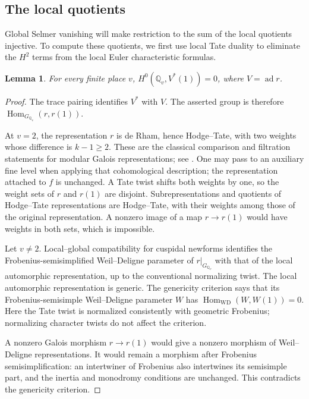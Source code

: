\documentclass[11pt]{article}
\newtheorem{lemma}[theorem]{Lemma}
\theoremstyle{remark}
\numberwithin{equation}{section}
\newcommand{\Q}{\mathbb Q}
\DeclareMathOperator{\Hom}{Hom}
\DeclareMathOperator{\ad}{ad}
\begin{document}
\subsection{The local quotients}
Global Selmer vanishing will make restriction to the sum of the
local quotients injective. To compute these quotients, we first use
local Tate duality to eliminate the $H^2$ terms from the local
Euler characteristic formulas.

\begin{lemma}\label{lem:local-invariants}
For every finite place $v$,
$H^0(\Q_v,V^*(1))=0$, where $V=\ad r$.
\end{lemma}
\begin{proof}
The trace pairing identifies $V^*$ with $V$. The asserted group
is therefore $\Hom_{G_{\Q_v}}(r,r(1))$.

At $v=2$, the representation $r$ is de Rham, hence Hodge--Tate,
with two weights whose difference is $k-1\geq2$. These are the
classical comparison and filtration statements for modular Galois
representations; see \cite[Section~11.3, especially (11.3.3)--(11.3.4)]{Kato04}.
One may pass to an auxiliary fine level when applying that
cohomological description; the representation attached to $f$ is unchanged.
A Tate twist shifts both weights by one, so the weight sets of
$r$ and $r(1)$ are disjoint. Subrepresentations and quotients of
Hodge--Tate representations are Hodge--Tate, with their weights
among those of the original representation. A nonzero image of
a map $r\to r(1)$ would have weights in both sets, which is
impossible.

Let $v\ne2$. Local--global compatibility for cuspidal newforms
\cite[Theorem~A]{Carayol86} identifies the Frobenius-semisimplified
Weil--Deligne parameter of $r|_{G_{\Q_v}}$ with that of the
local automorphic representation, up to the conventional
normalizing twist. The local automorphic representation is
generic. The genericity criterion
\cite[Lemma~1.1.3]{Allen16} says that its Frobenius-semisimple
Weil--Deligne parameter $W$ has
$\Hom_{\mathrm{WD}}(W,W(1))=0$. Here the Tate twist is normalized
consistently with geometric Frobenius; normalizing character
twists do not affect the criterion.

A nonzero Galois morphism $r\to r(1)$ would give a nonzero
morphism of Weil--Deligne representations. It would remain a
morphism after Frobenius semisimplification: an intertwiner of
Frobenius also intertwines its semisimple part, and the inertia
and monodromy conditions are unchanged. This contradicts the
genericity criterion.
\end{proof}
\end{document}
